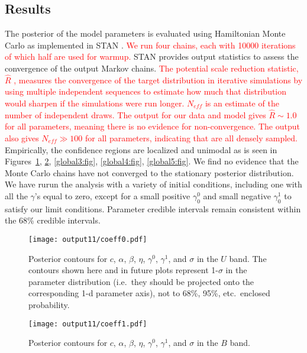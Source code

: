 \documentclass{aastex61}   	%
\begin{document}
\subsection{Results}
\label{results:sec}
The posterior of the model parameters is evaluated using Hamiltonian Monte Carlo as implemented in
STAN \citep{stan}.  \textcolor{red}{We run four chains, each with 10000 iterations of which
half are used for warmup.}
STAN provides output statistics to assess
the convergence of the output Markov chains.
\textcolor{red}{The 
potential scale reduction statistic, $\hat{R}$ \citep{Gelman92}, measures the convergence of the target distribution
in iterative simulations 
by using multiple independent sequences to estimate how much that distribution would sharpen if the simulations were run longer.
$N_{eff}$ is an estimate of the number of independent draws. The output for our data and model gives $\hat{R} \sim 1.0$ for all parameters, meaning there is no evidence for non-convergence.  The
output also gives  $N_{eff} \gg 100$ for all parameters, indicating that are all densely sampled.}
Empirically, the confidence regions are localized and unimodal as is seen in  Figures~\ref{global1:fig}, \ref{global2:fig}, \ref{global3:fig}, \ref{global4:fig},
\ref{global5:fig}.  We find no evidence that
the Monte Carlo chains have not converged to the stationary posterior distribution.
We have rurun the analysis with a variety of initial conditions, including one with all the $\gamma$'s equal to zero, except for a small positive 
$\gamma^0_0$ and small negative $\gamma^1_0$ to satisfy our limit conditions.  Parameter credible intervals
remain consistent within the 68\% credible intervals.

\begin{figure}[htbp] %
   \centering
   \texttt{[image: output11/coeff0.pdf]} 
            \caption{Posterior contours for $c$, $\alpha$, $\beta$, $\eta$, $\gamma^0$, $\gamma^1$, and $\sigma$ in the $U$ band.
            The contours shown here and in future plots represent 1-$\sigma$ in the parameter distribution (i.e.\ they should be
            projected onto the corresponding 1-d parameter axis), not to 68\%, 95\%, etc.\
            enclosed probability.  \label{global1:fig}}
\end{figure}

\begin{figure}[htbp] %
   \centering
   \texttt{[image: output11/coeff1.pdf]} 
            \caption{Posterior contours for $c$, $\alpha$, $\beta$, $\eta$, $\gamma^0$, $\gamma^1$, and $\sigma$ in the $B$ band.
 \label{global2:fig}}
\end{figure}
\end{document}
